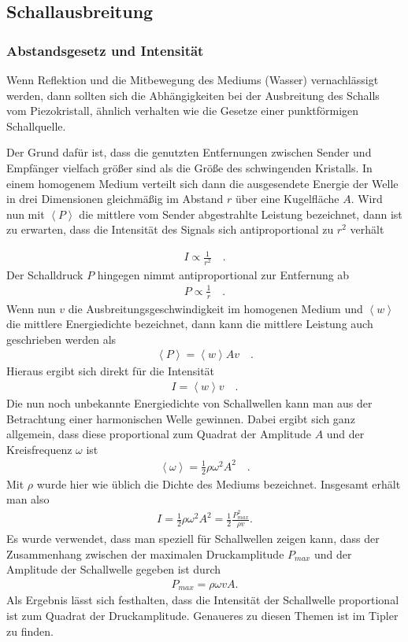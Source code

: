 \documentclass[12pt,a4paper,titlepage,headinclude,bibtotoc]{scrartcl}
\numberwithin{equation}{subsection}
\begin{document}
\subsection{Schallausbreitung}

\subsubsection{Abstandsgesetz und Intensität}

Wenn Reflektion und die Mitbewegung des Mediums (Wasser) vernachlässigt werden, dann sollten sich die Abhängigkeiten bei der Ausbreitung des Schalls vom Piezokristall, ähnlich verhalten wie die Gesetze einer punktförmigen Schallquelle.

Der Grund dafür ist, dass die genutzten Entfernungen zwischen Sender und Empfänger vielfach größer sind als die Größe des schwingenden Kristalls. 
In einem homogenem Medium verteilt sich dann die ausgesendete Energie der Welle in drei Dimensionen gleichmäßig im Abstand $r$ über eine Kugelfläche $A$.
Wird nun mit $\left<P\right>$ die mittlere vom Sender abgestrahlte Leistung 
bezeichnet, dann ist zu erwarten, dass die Intensität des Signals sich antiproportional zu $r^2$ verhält

\begin{align}
 I \propto \frac{1}{r^2}\quad .
\end{align}
Der Schalldruck $P$ hingegen nimmt antiproportional zur Entfernung ab
\begin{align}
 P \propto \frac{1}{r}\quad .
\end{align}
Wenn nun $v$ die Ausbreitungsgeschwindigkeit im homogenen Medium und $\left<w\right>$ die mittlere Energiedichte bezeichnet, dann kann die mittlere Leistung auch geschrieben werden als
\begin{align}
 \left<P\right>  = \left<w\right> A v\quad .
\end{align}
Hieraus ergibt sich direkt für die Intensität
\begin{align}
 I = \left<w\right> v\quad.
\end{align}
Die nun noch unbekannte Energiedichte von Schallwellen kann man aus der Betrachtung einer harmonischen Welle gewinnen. Dabei ergibt sich ganz allgemein, dass diese 
proportional zum Quadrat der Amplitude $A$ und der Kreisfrequenz $\omega$ ist
\begin{align}
 \left<\omega\right> = \frac{1}{2} \rho \omega^2 A^2\quad .
\end{align}
Mit $\rho$ wurde hier wie üblich die Dichte des Mediums bezeichnet.
Insgesamt erhält man also
\begin{align}
 I = \frac{1}{2} \rho \omega^2 A^2 = \frac{1}{2} \frac{P_{max}^2}{\rho v}.
\end{align}
Es wurde verwendet, dass man speziell für Schallwellen zeigen kann, dass der Zusammenhang zwischen der maximalen Druckamplitude $P_{max}$ und der Amplitude der Schallwelle gegeben ist durch
\begin{align}
 P_{max} = \rho \omega v A.
\end{align}
Als Ergebnis lässt sich festhalten, dass die Intensität der Schallwelle proportional ist zum Quadrat der Druckamplitude. Genaueres zu diesen Themen ist im Tipler \cite[S.598]{tipler} zu finden.
\end{document}
